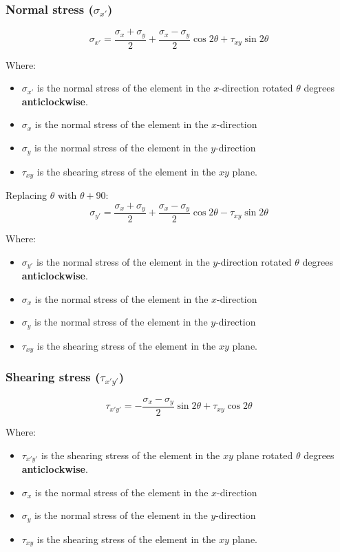 \documentclass[11pt]{article}
\begin{document}
\subsubsection{Normal stress (\(\sigma_{x'}\))}
\label{sec:orgae814f0}
\[\sigma_{x'} = \frac{\sigma_x + \sigma_y}{2} + \frac{\sigma_x - \sigma_y}{2} \cos 2 \theta + \tau_{xy} \sin 2 \theta\]

Where:
\begin{itemize}
\item \(\sigma_{x'}\) is the normal stress of the element in the \(x\)-direction rotated \(\theta\) degrees \textbf{anticlockwise}.
\item \(\sigma_x\) is the normal stress of the element in the \(x\)-direction
\item \(\sigma_y\) is the normal stress of the element in the \(y\)-direction
\item \(\tau_{xy}\) is the shearing stress of the element in the \(xy\) plane.
\end{itemize}

Replacing \(\theta\) with \(\theta + 90\):
\[\sigma_{y'} = \frac{\sigma_x + \sigma_y}{2} + \frac{\sigma_x - \sigma_y}{2} \cos 2 \theta - \tau_{xy} \sin 2 \theta\]

Where:
\begin{itemize}
\item \(\sigma_{y'}\) is the normal stress of the element in the \(y\)-direction rotated \(\theta\) degrees \textbf{anticlockwise}.
\item \(\sigma_x\) is the normal stress of the element in the \(x\)-direction
\item \(\sigma_y\) is the normal stress of the element in the \(y\)-direction
\item \(\tau_{xy}\) is the shearing stress of the element in the \(xy\) plane.
\end{itemize}
\subsubsection{Shearing stress (\(\tau_{x'y'}\))}
\label{sec:org1318f64}
\[\tau_{x'y'} = - \frac{\sigma_x - \sigma_y}{2} \sin 2 \theta + \tau_{xy} \cos 2 \theta\]

Where:
\begin{itemize}
\item \(\tau_{x'y'}\) is the shearing stress of the element in the \(xy\) plane rotated \(\theta\) degrees \textbf{anticlockwise}.
\item \(\sigma_x\) is the normal stress of the element in the \(x\)-direction
\item \(\sigma_y\) is the normal stress of the element in the \(y\)-direction
\item \(\tau_{xy}\) is the shearing stress of the element in the \(xy\) plane.
\end{itemize}
\end{document}
